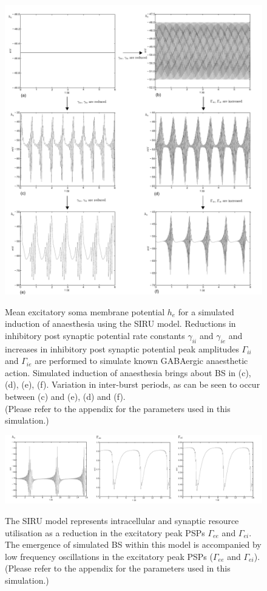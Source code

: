 \documentclass[a4paper,12pt]{article}
\begin{document}
\begin{figure}
	\includegraphics[scale=0.75]{frontiers-2012-working-images/figure-2-intra.pdf}
	\label{fig:intra_gamma}
	\caption{Mean excitatory soma membrane potential $h_e$ for a simulated induction of anaesthesia using the SIRU model. 
Reductions in inhibitory post synaptic potential rate constants $\gamma_{ii}$ and $\gamma_{ie}$ and increases in inhibitory post synaptic potential peak amplitudes $\Gamma_{ii}$ and $\Gamma_{ie}$ are performed to simulate known GABAergic anaesthetic action. Simulated induction of anaesthesia brings about BS in (c), (d), (e), (f). Variation in inter-burst periods, as can be seen to occur between (c) and (e), (d) and (f).\\
(Please refer to the appendix for the parameters used in this simulation.)\\
}
\end{figure}

\begin{figure}
	\includegraphics[scale=0.75]{frontiers-2012-working-images/figure-3-intra.pdf}
      \label{fig:emerging_slow_intra}
	\caption{The SIRU model represents intracellular and synaptic resource utilisation as a reduction in the excitatory peak PSPs $\Gamma_{ee}$ and $\Gamma_{ei}$. The emergence of simulated BS within this model is accompanied by low frequency oscillations in the excitatory peak PSPs ($\Gamma_{ee}$ and $\Gamma_{ei}$). 
	(Please refer to the appendix for the parameters used in this simulation.)}
\end{figure}
\end{document}
